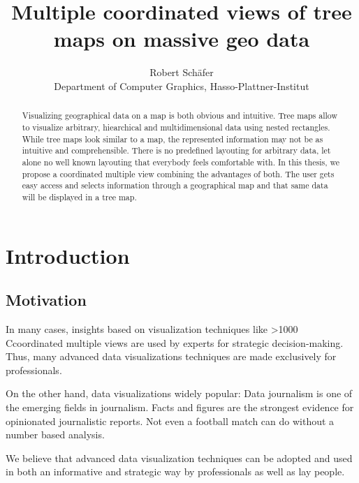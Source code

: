 \documentclass{article}
\begin{document}
\title{Multiple coordinated views of tree maps on massive geo data}
\author{Robert Schäfer\\ Department of Computer Graphics, Hasso-Plattner-Institut}
\maketitle

\newcommand{\rufu}{Rundfunk \textsc{mitbestimmen}}
\newcommand\hmm[1]{\ifnum\ifhmode\spacefactor\else2000\fi>1000 \uppercase{#1}\else#1\fi}
\newcommand{\cmv}{\hmm{c}oordinated multiple view}
\newcommand{\cmvs}{\hmm{c}oordinated multiple views}

\begin{abstract}
  Visualizing geographical data on a map is both obvious and intuitive.
  Tree maps allow to visualize arbitrary, hiearchical and multidimensional data using nested rectangles.
  While tree maps look similar to a map, the represented information may not be as intuitive and comprehensible.
  There is no predefined layouting for arbitrary data, let alone no well known layouting that everybody feels comfortable with.
  In this thesis, we propose a coordinated multiple view combining the advantages of both.
  The user gets easy access and selects information through a geographical map and that same data will be displayed in a tree map.
\end{abstract}

\section{Introduction}

\subsection{Motivation}


In many cases, insights based on visualization techniques like \cmvs{} are used by experts for strategic decision-making.
Thus, many advanced data visualizations techniques are made exclusively for professionals.

On the other hand, data visualizations widely popular:
Data journalism is one of the emerging fields in journalism.
Facts and figures are the strongest evidence for opinionated journalistic reports.
Not even a football match can do without a number based analysis.

We believe that advanced data visualization techniques can be adopted and used in both an informative and strategic way by professionals as well as lay people.
\end{document}
